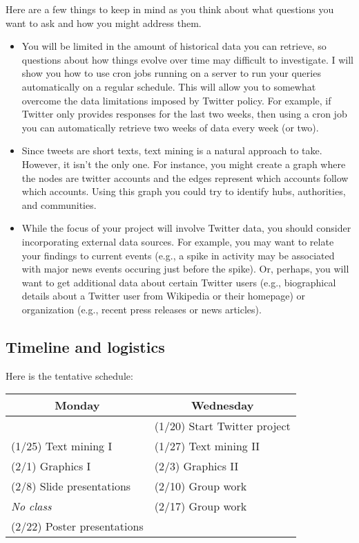 \documentclass[11pt, oneside]{article}   	%
\begin{document}
Here are a few things to keep in mind as you think about what questions you
want to ask and how you might address them.

\begin{itemize}

\item You will be limited in the amount of historical data you can retrieve, so
questions about how things evolve over time may difficult to investigate.  I
will show you how to use cron jobs running on a server to run your queries
automatically on a regular schedule.  This will allow you to somewhat overcome
the data limitations imposed by Twitter policy.  For example, if Twitter only
provides responses for the last two weeks, then using a cron job you can
automatically retrieve two weeks of data every week (or two).

\item Since tweets are short texts, text mining is a natural approach to take.
However, it isn't the only one.  For instance, you might create a graph where
the nodes are twitter accounts and the edges represent which accounts follow
which accounts. Using this graph you could try to identify hubs, authorities,
and communities.

\item While the focus of your project will involve Twitter data, you should
consider incorporating external data sources.  For example, you may want to
relate your findings to current events (e.g., a spike in activity may be
associated with major news events occuring just before the spike).  Or,
perhaps, you will want to get additional data about certain Twitter users
(e.g., biographical details about a Twitter user from Wikipedia or
their homepage) or organization (e.g., recent press releases or news articles).

\end{itemize}

\subsection*{Timeline and logistics}

Here is the tentative schedule:

\begin{table}[h]
\centering
\begin{tabular}{@{}l|l@{}}
\toprule
\multicolumn{1}{c|}{Monday} & \multicolumn{1}{c}{Wednesday} \\
\hline
                             & (1/20) Start Twitter project \\
(1/25) Text mining I         & (1/27) Text mining II \\
(2/1) Graphics I             & (2/3) Graphics II \\
(2/8) Slide presentations    & (2/10) Group work \\
\emph{\hspace{12mm} No class} & (2/17) Group work \\                                       
(2/22) Poster presentations  & \\                                       
\bottomrule
\end{tabular}
\end{table}
\end{document}
